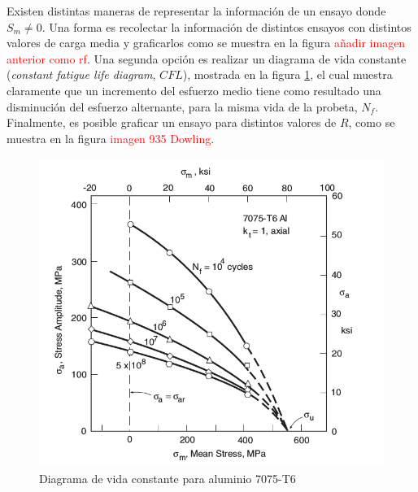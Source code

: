 Existen distintas maneras de representar la información de un ensayo donde $S_m \neq 0$. Una forma es recolectar la información de distintos ensayos con distintos valores de carga media y graficarlos como se muestra en la figura \textcolor{red}{añadir imagen anterior como rf}. Una segunda opción es realizar un diagrama de vida constante (\textit{constant fatigue life diagram}, $CFL$), mostrada en la figura \ref{fig:diag_cfl}, el cual muestra claramente que un incremento del esfuerzo medio tiene como resultado una disminución del esfuerzo alternante, para la misma vida de la probeta, $N_f$. Finalmente, es posible graficar un ensayo para distintos valores de $R$, como se muestra en la figura \textcolor{red}{imagen 935 Dowling}.

\begin{figure}[h]
\centering
\includegraphics[width=\textwidth]{Imagenes/diag_cfl.png}
\caption{Diagrama de vida constante para aluminio 7075-T6}
\label{fig:diag_cfl}
\end{figure}

